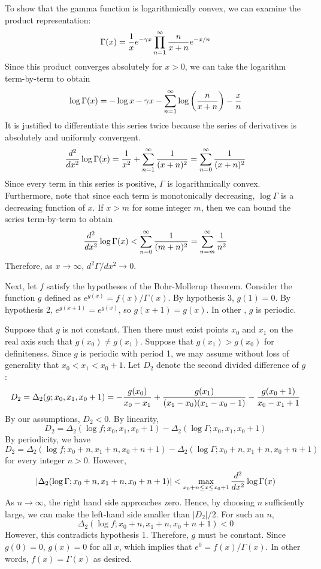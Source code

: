 \documentclass[12pt]{article}
\begin{document}
To show that the gamma function is logarithmically convex, we can examine the product representation:
 $$\Gamma (x) = {1 \over x} e^{- \gamma x} \prod_{n = 1}^\infty {n \over x + n} e^{-x/n}$$
Since this product converges absolutely for $x > 0$, we can take the logarithm term-by-term to obtain
 $$\log \Gamma (x) = - \log x - \gamma x - \sum_{n = 1}^\infty \log \left( {n \over x + n} \right) - {x \over n}$$
It is justified to differentiate this series twice because the series of derivatives is absolutely and uniformly convergent.
 $${d^2 \over dx^2} \log \Gamma (x) = {1 \over x^2} + \sum_{n = 1}^\infty {1 \over (x + n)^2} = \sum_{n = 0}^\infty {1 \over (x + n)^2}$$
Since every term in this series is positive, $\Gamma$ is logarithmically convex.  Furthermore, note that since each term is monotonically decreasing, $\log \Gamma$ is a decreasing function of $x$.  If $x > m$ for some integer $m$, then we can bound the series term-by-term to obtain
 $${d^2 \over dx^2} \log \Gamma (x) < \sum_{n = 0}^\infty {1 \over (m + n)^2} = \sum_{n = m}^\infty {1 \over n^2}$$
Therefore, as $x \to \infty$, $d^2 \Gamma / dx^2 \to 0$.

Next, let $f$ satisfy the hypotheses of the Bohr-Mollerup theorem.  Consider the function $g$ defined as $e^{g(x)} = f(x) / \Gamma (x)$.  By hypothesis 3, $g(1) = 0$.  By hypothesis 2, $e^{g(x + 1)} = e^{g(x)}$, so $g(x+1) = g(x)$.  In other , $g$ is periodic.

Suppose that $g$ is not constant.  Then there must exist points $x_0$ and $x_1$ on the real axis such that $g(x_0) \neq g(x_1)$.  Suppose that $g(x_1) > g(x_0)$ for definiteness.  Since $g$ is periodic with period 1, we may assume without loss of generality that $x_0 < x_1 < x_0 + 1$.  Let $D_2$ denote the second divided difference of $g$:
 $$D_2 = \Delta_2 (g; x_0, x_1, x_0 + 1) = - {g(x_0) \over x_0 - x_1} + {g(x_1) \over (x_1 - x_0)(x_1 - x_0 - 1)} - {g(x_0 + 1) \over x_0 - x_1 + 1}$$
By our assumptions, $D_2 < 0$.  By linearity,
 $$D_2 = \Delta_2 (\log f; x_0, x_1, x_0 + 1) - \Delta_2 (\log \Gamma; x_0, x_1, x_0 + 1)$$
By periodicity, we have
 $$D_2 = \Delta_2 (\log f; x_0 + n, x_1 + n, x_0 + n + 1) - \Delta_2 (\log \Gamma; x_0 + n, x_1 + n, x_0 + n + 1)$$
for every integer $n > 0$.  However,
 $$|\Delta_2 (\log \Gamma; x_0 + n, x_1 + n, x_0 + n + 1)| < \max_{x_0 + n \le x \le x_0 + 1} {d^2 \over dx^2} \log \Gamma (x)$$
As $n \to \infty$, the right hand side approaches zero.  Hence, by choosing $n$ sufficiently large, we can make the left-hand side smaller than $|D_2|/2$.  For such an $n$,
 $$\Delta_2 (\log f; x_0 + n, x_1 + n, x_0 + n + 1) < 0$$
However, this contradicts hypothesis 1.  Therefore, $g$ must be constant.  Since $g(0) = 0$, $g(x) = 0$ for all $x$, which implies that $e^0 = f(x) / \Gamma(x)$.  In other words, $f(x) = \Gamma(x)$ as desired.
\end{document}
